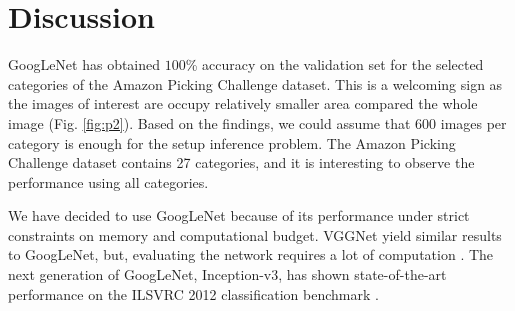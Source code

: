 \documentclass[10pt,journal,compsoc]{IEEEtran}
\begin{document}

\section{Discussion}

GoogLeNet has obtained $100$\% accuracy on the validation set for the selected categories of the  Amazon Picking Challenge dataset. This is a welcoming sign as the images of interest are occupy relatively smaller area compared the whole image (Fig. \ref{fig:p2}). Based on the findings, we could assume that 600 images per category is enough for the setup inference problem. The Amazon Picking Challenge dataset contains 27 categories, and it is interesting to observe the performance using all categories. 

We have decided to use GoogLeNet because of its performance under strict constraints on memory and computational budget. VGGNet yield similar results to GoogLeNet, but, evaluating the network requires a lot of computation \cite{44903}. The next generation of GoogLeNet, Inception-v3, has shown state-of-the-art performance on the ILSVRC 2012 classification benchmark \cite{44903}. 

\end{document}
